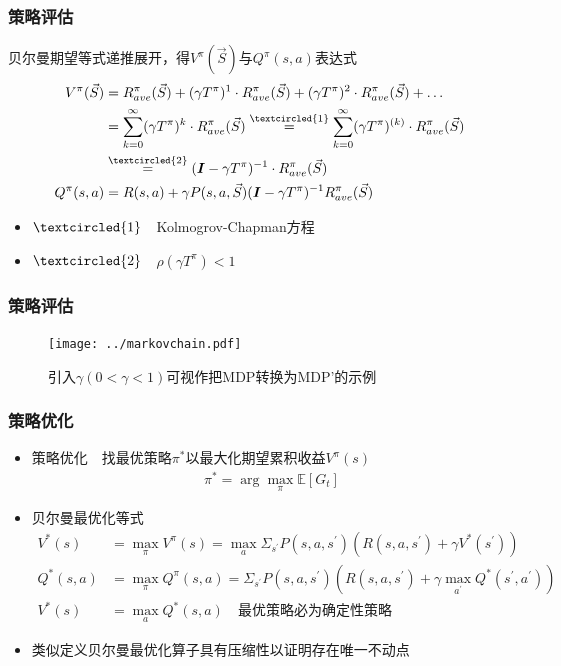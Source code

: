 \documentclass{beamer}
\begin{document}
\begin{CJK*}{GBK}{hei}
\begin{frame}\frametitle{策略评估}
\begin{theorem}
贝尔曼期望等式递推展开，得$V^{\pi}(\vec S)$与$Q^{\pi}(s, a)$表达式
        \begin{align*}
          V^{\pi}(\vec S) &= R^{\pi}_{ave}(\vec S) + (\gamma T^{\pi})^{1} \cdot R^{\pi}_{ave}(\vec S) + (\gamma T^{\pi})^{2} \cdot R^{\pi}_{ave}(\vec S) + \dots\\
              &= \sum_{k=0}^{\infty} (\gamma T^{\pi})^{k}\cdot R^{\pi}_{ave}(\vec S)\overset{\textcircled{\small{1}}}{=} \sum_{k=0}^{\infty} (\gamma T^{\pi})^{(k)}\cdot R^{\pi}_{ave}(\vec S)\\
              &\overset{\textcircled{\small{2}}}{=} (\boldsymbol{I}-\gamma T^{\pi})^{-1}\cdot R^{\pi}_{ave}(\vec S)\\
          Q^{\pi}(s, a)&=R(s,a)+\gamma P(s,a,\vec S)(\boldsymbol{I}-\gamma T^{\pi})^{-1}R_{ave}^{\pi}(\vec S)
        \end{align*}
        \begin{itemize}
        \item $\textcircled{\small{1}}$~~Kolmogrov-Chapman方程
        \item $\textcircled{\small{2}}$~~$\rho(\gamma T^{\pi})<1$
        \end{itemize}
\end{theorem}
\end{frame}

\begin{frame}\frametitle{策略评估}
    \begin{figure}[htbp]
       \centering\texttt{[image: ../markovchain.pdf]}
	   \caption{引入$\gamma(0<\gamma<1)$可视作把MDP转换为MDP'的示例}
    \end{figure}
\end{frame}

\begin{frame}\frametitle{策略优化}
\begin{itemize}
\item 策略优化~~找最优策略$\pi^{*}$以最大化期望累积收益$V^{\pi}(s)$
    \begin{align*}
        \pi^{*}=\arg \max _{\pi} \mathbb{E}[G_t]
    \end{align*}
\item 贝尔曼最优化等式
    {\small{
    \begin{align*}
        V^{*}(s) &=\max _{\pi} V^{\pi}(s)=\max _{a} \Sigma_{s^{\prime}} P\left(s, a, s^{\prime}\right)\left(R\left(s, a, s^{\prime}\right)+\gamma V^{*}\left(s^{\prime}\right)\right) \\
        Q^{*}(s, a) &=\max _{\pi} Q^{\pi}(s, a)=\Sigma_{s^{\prime}} P\left(s, a, s^{\prime}\right)\left(R\left(s, a, s^{\prime}\right)+\gamma \max _{a^{\prime}} Q^{*}\left(s^{\prime}, a^{\prime}\right)\right)\\
        V^{*}(s)&=\max_{a}Q^{*}(s, a)\quad \scriptstyle{\text{最优策略必为确定性策略}}
    \end{align*}
    }}
\item 类似定义贝尔曼最优化算子具有压缩性以证明存在唯一不动点
\end{itemize}
\end{frame}


\end{CJK*}
\end{document}
